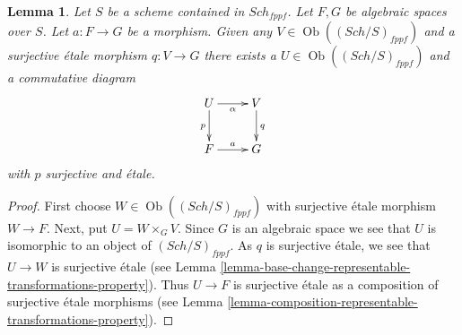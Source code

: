 \documentclass[10pt,a4paper]{amsart}
\theoremstyle{plain}
\newtheorem{lemma}[subsection]{Lemma}
\theoremstyle{definition}
\theoremstyle{remark}
\numberwithin{equation}{subsection}
\def\Sch{\mathit{Sch}}
\def\Ob{\mathop{\mathrm{Ob}}\nolimits}
\begin{document}
\begin{lemma}
\label{lemma-lift-morphism-presentations}
Let $S$ be a scheme contained in $\Sch_{fppf}$.
Let $F, G$ be algebraic spaces over $S$.
Let $a : F \to G$ be a morphism.
Given any $V \in \Ob((\Sch/S)_{fppf})$
and a surjective \'etale morphism $q : V \to G$ there exists
a $U \in \Ob((\Sch/S)_{fppf})$
and a commutative diagram
$$
\xymatrix{
U \ar[d]_p \ar[r]_\alpha &
V \ar[d]^q \\
F \ar[r]^a & G
}
$$
with $p$ surjective and \'etale.
\end{lemma}

\begin{proof}
First choose $W \in \Ob((\Sch/S)_{fppf})$
with surjective \'etale morphism $W \to F$.
Next, put $U = W \times_G V$. Since $G$ is an algebraic space
we see that $U$ is isomorphic to an object of $(\Sch/S)_{fppf}$.
As $q$ is surjective \'etale, we see that $U \to W$ is surjective
\'etale (see
Lemma \ref{lemma-base-change-representable-transformations-property}).
Thus $U \to F$ is surjective \'etale as a composition of surjective
\'etale morphisms (see
Lemma \ref{lemma-composition-representable-transformations-property}).
\end{proof}
\end{document}
